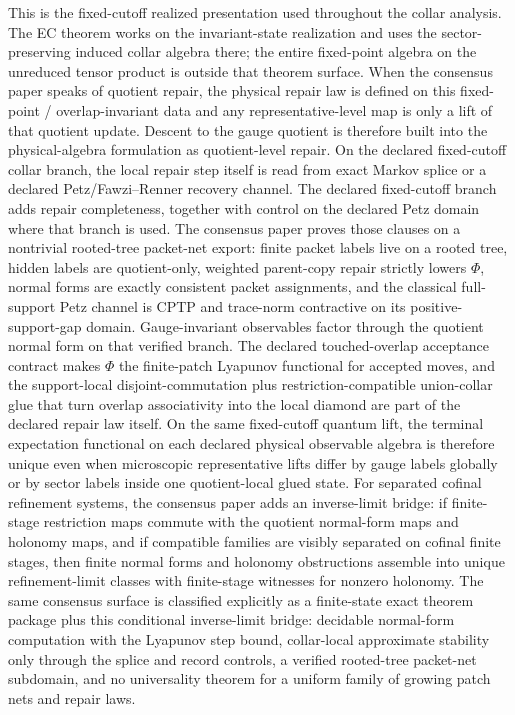 This is the fixed-cutoff realized presentation used throughout the collar analysis. The EC theorem works on the invariant-state realization and uses the sector-preserving induced collar algebra there; the entire fixed-point algebra on the unreduced tensor product is outside that theorem surface.
When the consensus paper speaks of quotient repair, the physical repair law is defined on
this fixed-point / overlap-invariant data and any representative-level map is only a lift of that
quotient update. Descent to the gauge quotient is therefore built into the physical-algebra
formulation as quotient-level repair. On the
declared fixed-cutoff collar branch, the local repair step itself is read from exact Markov splice
or a declared Petz/Fawzi--Renner recovery channel. The declared fixed-cutoff branch adds
repair completeness, together with control on the declared Petz domain
where that branch is used. The consensus paper proves those clauses on a nontrivial rooted-tree
packet-net export: finite packet labels live on a rooted tree, hidden labels are quotient-only,
weighted parent-copy repair strictly lowers \(\Phi\), normal forms are exactly consistent packet
assignments, and the classical full-support Petz channel is CPTP and trace-norm contractive on
its positive-support-gap domain. Gauge-invariant observables factor through the quotient normal
form on that verified branch. The declared touched-overlap acceptance contract makes \(\Phi\) the
finite-patch Lyapunov functional for accepted moves, and the support-local disjoint-commutation
plus restriction-compatible union-collar glue that turn overlap associativity into the local
diamond are part of the declared repair law itself. On the same fixed-cutoff quantum lift, the
terminal expectation functional on each declared physical observable algebra is therefore unique
even when microscopic representative lifts differ by gauge labels globally or by sector labels
inside one quotient-local glued state.
For separated cofinal refinement systems, the consensus paper adds an inverse-limit bridge:
if finite-stage restriction maps commute with the quotient normal-form maps and holonomy maps,
and if compatible families are visibly separated on cofinal finite stages, then finite normal
forms and holonomy obstructions assemble into unique refinement-limit classes with finite-stage
witnesses for nonzero holonomy. The same consensus surface is classified explicitly as a
finite-state exact theorem package plus this conditional inverse-limit bridge: decidable
normal-form computation with the Lyapunov step bound, collar-local approximate stability only
through the splice and record controls, a verified rooted-tree packet-net subdomain, and no
universality theorem for a uniform family of growing patch nets and repair laws.


